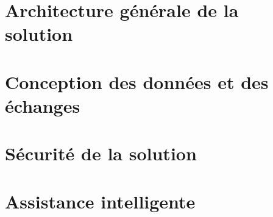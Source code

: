 \section{Architecture générale de la solution}
\label{sec:03-architecture-generale}

\section{Conception des données et des échanges}
\label{sec:03-donnees-echanges}

\section{Sécurité de la solution}
\label{sec:03-securite}

\section{Assistance intelligente}
\label{sec:03-assistance-intelligente}
